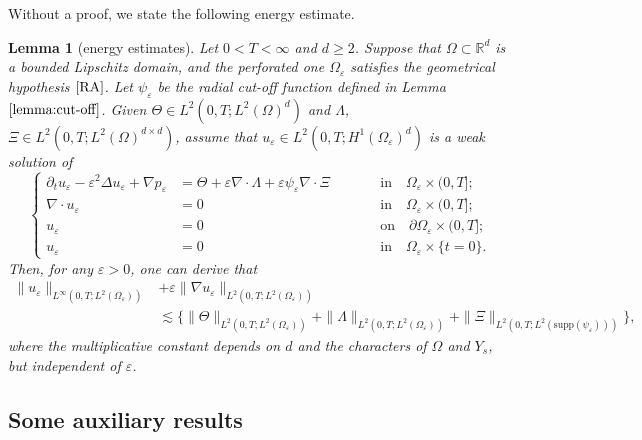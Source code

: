 \documentclass[13pt,CJK]{article}
\theoremstyle{plain}                       %
\newtheorem{lemma}{Lemma}[section]
\theoremstyle{remark}
\numberwithin{equation}{section}
\begin{document}
\medskip
Without a proof, we state the following energy estimate.

\begin{lemma}[energy estimates]\label{lemma3.1}
Let $0<T<\infty$ and $d\geq 2$.
Suppose that
$\Omega\subset\mathbb{R}^d$ is a bounded Lipschitz domain, and
the perforated one $\Omega_\varepsilon$
satisfies the geometrical hypothesis $\eqref{RA}$.
Let $\psi_{\varepsilon}$ be the radial cut-off function defined in Lemma $\ref{lemma:cut-off}$.
Given $\Theta\in L^2(0,T;L^2(\Omega)^d)$ and $\Lambda$, $\Xi\in L^2(0,T;L^2(\Omega)^{d\times d})$, assume
that $u_{\varepsilon}\in L^2(0,T;H^1(\Omega_{\varepsilon})^d)$ is a weak solution of
\begin{equation}\label{pde3.14}
\left\{\begin{aligned}
\partial_t u_{\varepsilon}-\varepsilon^2\Delta u_{\varepsilon}+\nabla p_{\varepsilon}&=\Theta+\varepsilon\nabla\cdot \Lambda+
\varepsilon\psi_{\varepsilon}
\nabla\cdot \Xi &\qquad& \text{in}\quad \Omega_{\varepsilon}\times (0,T];\\
\nabla\cdot u_{\varepsilon}&=0 &\qquad&\text{in}\quad \Omega_{\varepsilon}\times (0,T];\\
u_{\varepsilon}&=0 &\qquad&\text{on}\quad
\partial\Omega_{\varepsilon}\times(0,T];\\
u_{\varepsilon}&=0 &\qquad&\text{in}
\quad\Omega_{\varepsilon}\times\{t=0\}.
\end{aligned}\right.
\end{equation}
Then, for any $\varepsilon>0$, one can derive that
\begin{equation}\label{pde3.7}
\begin{aligned}
\|u_{\varepsilon}\|_{L^{\infty}
(0,T;L^2(\Omega_{\varepsilon}))}
&+\varepsilon
\|\nabla u_{\varepsilon}\|_{L^{2}
(0,T;L^2(\Omega_{\varepsilon}))}\\
&\lesssim
\bigg\{\|\Theta\|_{L^2(0,T;L^2(\Omega_{\varepsilon}))}
+\|\Lambda\|_{L^2(0,T;L^2(\Omega_{\varepsilon}))}
+\|\Xi\|_{L^2(0,T;L^2(\text{supp}
(\psi_{\varepsilon})))}\bigg\},
\end{aligned}
\end{equation}
where the multiplicative constant
depends on $d$ and the characters of
$\Omega$ and $Y_s$, but independent of $\varepsilon$.
\end{lemma}


\subsection{\centering Some auxiliary results}\label{subsec:5.1}
\end{document}
